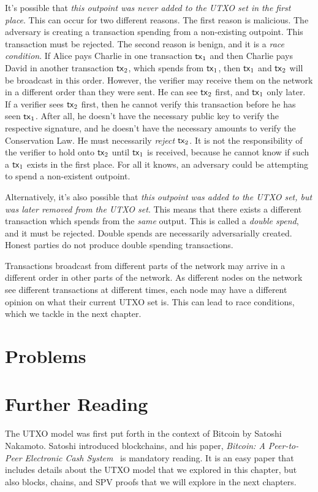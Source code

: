 It's possible that \emph{this outpoint was never added to the UTXO set in the first place}.
This can occur for two different reasons.
The first reason is malicious. The adversary is creating a transaction spending from
a non-existing outpoint. This transaction must be rejected.
The second reason is benign, and it is a \emph{race condition}.
If Alice pays Charlie in one transaction $\mathsf{tx}_1$ and then Charlie pays David in another
transaction $\mathsf{tx}_2$, which spends from $\mathsf{tx}_1$, then $\mathsf{tx}_1$ and $\mathsf{tx}_2$ will be broadcast
in this order. However, the verifier may receive them on the network
in a different order than they were sent. He can see $\mathsf{tx}_2$ first, and $\mathsf{tx}_1$ only later.
If a verifier sees $\mathsf{tx}_2$ first, then
he cannot verify this transaction before he has seen $\mathsf{tx}_1$. After all, he doesn't have
the necessary public key to verify the respective signature, and he doesn't have the
necessary amounts to verify the Conservation Law.
He must necessarily \emph{reject}
$\mathsf{tx}_2$. It is not
the responsibility of the verifier to hold onto $\mathsf{tx}_2$ until $\mathsf{tx}_1$ is received,
because he cannot know if such a $\mathsf{tx}_1$ exists in the first place. For all it knows,
an adversary could be attempting to spend a non-existent outpoint.

Alternatively, it's also possible that \emph{this outpoint was added to the UTXO set, but was later
removed from the UTXO set}. This means that there exists a different transaction
which spends from the \emph{same} output. This is called a \emph{double spend},
and it must be rejected. Double spends are necessarily adversarially created.
Honest parties do not produce double spending transactions.

Transactions broadcast from different parts of the network may arrive in a different order in other
parts of the network.
As different nodes on the network see different transactions
at different times, each node may have a different opinion on what their current UTXO set is.
This can lead to race conditions, which we tackle in the next chapter.

\section*{Problems}

\section*{Further Reading}

The UTXO model was first put forth in the context of Bitcoin by Satoshi Nakamoto. Satoshi
introduced blockchains, and his paper, \emph{Bitcoin: A Peer-to-Peer Electronic Cash System}~\cite{bitcoin} is
mandatory reading. It is an easy paper that includes details about the UTXO model that we explored
in this chapter, but also blocks, chains, and SPV proofs that we will explore in the next chapters.

